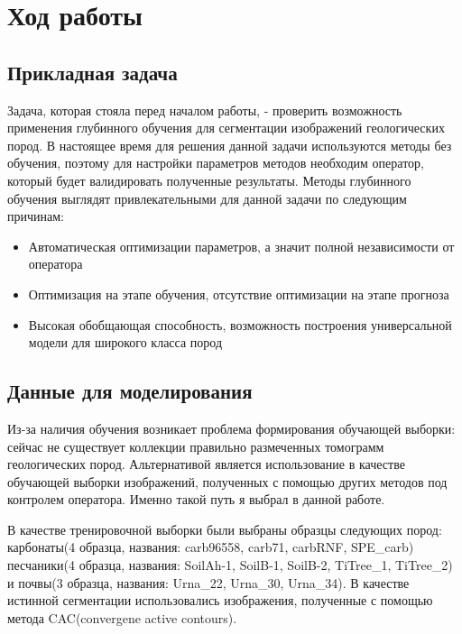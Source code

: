 \documentclass[14pt, a4paper, oneside, bold]{extarticle}
\begin{document}
\newpage


\section{Ход работы} \label{seg_tasks}

\subsection{Прикладная задача}

Задача, которая стояла перед началом работы, - проверить возможность применения глубинного обучения для сегментации изображений геологических пород. В настоящее время для решения данной задачи используются методы без обучения, поэтому для настройки параметров методов необходим оператор, который будет валидировать полученные результаты.
Методы глубинного обучения выглядят привлекательными для данной задачи по следующим причинам:
\begin{itemize}
	\item Автоматическая оптимизации параметров, а значит полной 	независимости от оператора
	
	\item Оптимизация на этапе обучения, отсутствие оптимизации на этапе прогноза 
	
	\item Высокая обобщающая способность, возможность построения универсальной модели для широкого класса пород
	
\end{itemize}
 
\subsection{Данные для моделирования}

Из-за наличия обучения возникает проблема формирования обучающей выборки: сейчас не существует коллекции правильно размеченных томограмм геологических пород. Альтернативой является использование в качестве обучающей выборки изображений, полученных с помощью других методов под контролем оператора. Именно такой путь я выбрал в данной работе.

В качестве тренировочной выборки были выбраны образцы следующих пород: карбонаты(4 образца, названия: carb96558, carb71, carbRNF, SPE\_carb)  песчаники(4 образца, названия: SoilAh-1, SoilB-1, SoilB-2, TiTree\_1, TiTree\_2) и почвы(3 образца, названия: Urna\_22, Urna\_30, Urna\_34). В	качестве истинной сегментации использовались изображения, полученные с помощью метода CAC(convergene active contours).
\end{document}
